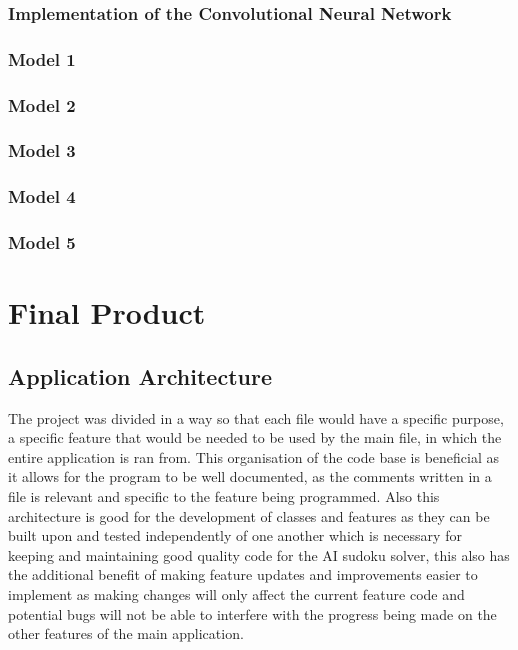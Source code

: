 \documentclass[]{final_report}
\begin{document}
\subsection{Implementation of the Convolutional Neural Network}

\subsection{Model 1}
\subsection{Model 2}
\subsection{Model 3}
\subsection{Model 4}
\subsection{Model 5}

\chapter{Final Product}

\section{Application Architecture}

The project was divided in a way so that each file would have a specific purpose, a specific feature that would be needed to be used by the main file, in which the entire application is ran from. This organisation of the code base is beneficial as it allows for the program to be well documented, as the comments written in a file is relevant and specific to the feature being programmed. Also this architecture is good for the development of classes and features as they can be built upon and tested independently of one another which is necessary for keeping and maintaining good quality code for the AI sudoku solver, this also has the additional benefit of making feature updates and improvements easier to implement as making changes will only affect the current feature code and potential bugs will not be able to interfere with the progress being made on the other features of the main application. 
\end{document}
